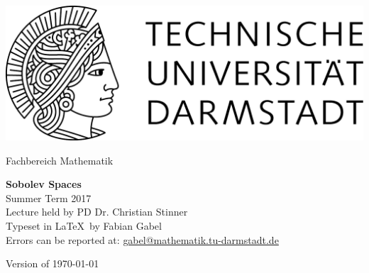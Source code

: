 \documentclass[11pt,a4paper,leqno]{report}
\begin{document}
\hypersetup{pageanchor=false}
\begin{titlepage}
  \begin{center}
    \vspace{1cm}
    \includegraphics[width=0.5\linewidth]{TU_Darmstadt_Logo.pdf}
    \vspace{1cm}
    
    \large{Fachbereich Mathematik}
    \vspace{3.5cm}
    
    \Huge{\textbf{Sobolev Spaces}\\}
    \vspace*{0.5cm}    
    \Large{{Summer Term 2017}\\}
    \vspace*{0.5cm}    
    \small{Lecture held by PD Dr. Christian Stinner\\}
    \vspace*{1.0cm}
    \small{Typeset in \LaTeX\ by Fabian Gabel\\}
    \small{Errors can be reported at: \href{mailto:gabel@mathematik.tu-darmstadt.de}{gabel@mathematik.tu-darmstadt.de}}

    \vspace*{\fill}
    \small{Version of \today}
  \end{center}
\end{titlepage}

\hypersetup{pageanchor=true}
\tableofcontents









\end{document}
